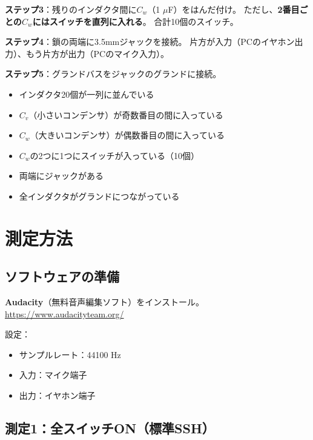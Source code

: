 \documentclass[12pt,a4paper]{article}
\begin{document}
\textbf{ステップ3}：残りのインダクタ間に$C_w$（1 $\mu$F）をはんだ付け。
ただし、\textbf{2番目ごとの$C_w$にはスイッチを直列に入れる}。
合計10個のスイッチ。

\textbf{ステップ4}：鎖の両端に3.5mmジャックを接続。
片方が入力（PCのイヤホン出力）、もう片方が出力（PCのマイク入力）。

\textbf{ステップ5}：グランドバスをジャックのグランドに接続。

\begin{keybox}[チェックポイント]
\begin{itemize}
\item[$\square$] インダクタ20個が一列に並んでいる
\item[$\square$] $C_v$（小さいコンデンサ）が奇数番目の間に入っている
\item[$\square$] $C_w$（大きいコンデンサ）が偶数番目の間に入っている
\item[$\square$] $C_w$の2つに1つにスイッチが入っている（10個）
\item[$\square$] 両端にジャックがある
\item[$\square$] 全インダクタがグランドにつながっている
\end{itemize}
\end{keybox}

\section{測定方法}

\subsection{ソフトウェアの準備}

\textbf{Audacity}（無料音声編集ソフト）をインストール。
\url{https://www.audacityteam.org/}

設定：
\begin{itemize}
\item サンプルレート：44100 Hz
\item 入力：マイク端子
\item 出力：イヤホン端子
\end{itemize}

\subsection{測定1：全スイッチON（標準SSH）}
\end{document}
